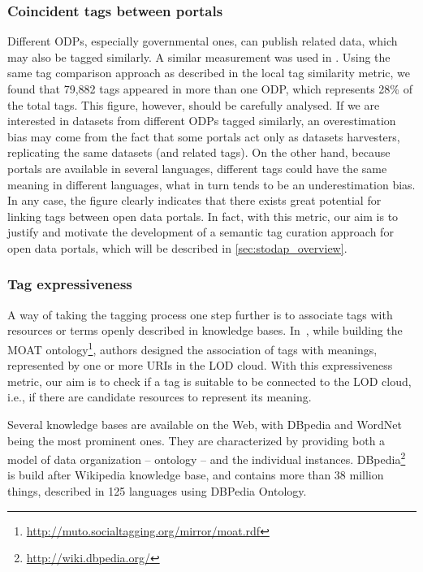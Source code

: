 \subsubsection{Coincident tags between portals}
Different ODPs, especially governmental ones, can publish related data, which may also be tagged similarly.
A similar measurement was used in \cite{Umbrich2015}.
Using the same tag comparison approach as described in the local tag similarity metric, we found that 79,882 tags appeared in more than one ODP, which represents 28\% of the total tags. 
This figure, however, should be carefully analysed. 
If we are interested in datasets from different ODPs tagged similarly, an overestimation bias may come from the fact that some portals act only as datasets harvesters, replicating the same datasets (and related tags). 
On the other hand, because portals are available in several languages, different tags could have the same meaning in different languages, what in turn tends to be an underestimation bias.
In any case, the figure clearly indicates that there exists great potential for linking tags between open data portals.
In fact, with this metric, our aim is to justify and motivate the development of a semantic tag curation approach for open data portals, which will be described in \ref{sec:stodap_overview}. 



\subsubsection{Tag expressiveness}
A way of taking the tagging process one step further is to associate tags with resources or terms openly described in knowledge bases.
In~\cite{Passant2008}, while building the MOAT ontology\footnote{\url{http://muto.socialtagging.org/mirror/moat.rdf}}, authors designed the association of tags with meanings, represented by one or more URIs in the LOD cloud.
With this expressiveness metric, our aim is to check if a tag is suitable to be connected to the LOD cloud, i.e., if there are candidate resources to represent its meaning.

Several knowledge bases are available on the Web, with DBpedia and WordNet being the most prominent ones.
They are characterized by providing both a model of data organization -- ontology -- and the individual instances.
DBpedia\footnote{\url{http://wiki.dbpedia.org/}} is build after Wikipedia knowledge base, and contains more than 38 million things, described in 125 languages using DBPedia Ontology.

